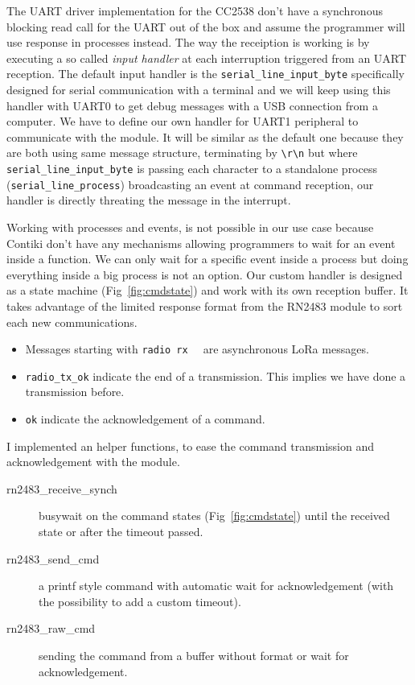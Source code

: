 The UART driver implementation for the CC2538 don't have a synchronous blocking
read call for the UART out of the box and assume the programmer will use
response in processes instead. The way the receiption is working is by executing a 
so called \emph{input handler} at each interruption triggered from an 
UART reception.
The default input handler is the \lstinline{serial_line_input_byte} 
specifically designed for serial communication with a terminal and we will keep
using this handler with UART0 to get debug messages with a USB connection from 
a computer.
We have to define our own handler for UART1 peripheral to communicate with the
module.
It will be similar as the default one because they are both using same message
structure, terminating by \lstinline{\r\n} but 
where \lstinline{serial_line_input_byte} is passing each character to a standalone
process (\lstinline{serial_line_process}) broadcasting an event at command
reception, our handler is directly threating  the message in the interrupt.

Working with processes and events, is not possible in our use case because Contiki 
don't have any mechanisms allowing programmers to wait for an event inside a 
function. We can only wait for a specific event inside a process but doing 
everything inside a big process is not an option.
Our custom handler is designed as a state machine (Fig~\ref{fig:cmdstate}) and 
work with its own reception buffer. It takes advantage of the limited response 
format from the RN2483 module to sort each new communications.

\begin{itemize}
  \item Messages starting with \lstinline{radio rx  } are asynchronous LoRa
    messages.
  \item \lstinline{radio_tx_ok} indicate the end of a transmission. This
    implies we have done a transmission before.
  \item \lstinline{ok} indicate the acknowledgement of a command.
\end{itemize}


I implemented an helper functions, to ease the command transmission and
acknowledgement with the module.

\begin{description}
  \item[rn2483\_receive\_synch] busywait on the command states
    (Fig~\ref{fig:cmdstate}) until the received state or after the timeout
    passed.
  \item[rn2483\_send\_cmd] a printf style command with automatic wait
    for acknowledgement (with the possibility to add a custom timeout).
  \item[rn2483\_raw\_cmd] sending the command from a buffer without
    format or wait for acknowledgement.
\end{description}

